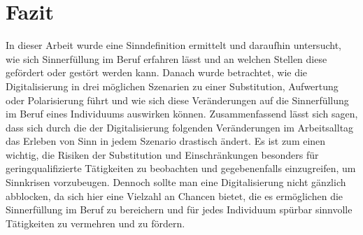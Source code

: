 \chapter{Fazit}
In dieser Arbeit wurde eine Sinndefinition ermittelt und daraufhin untersucht, wie sich Sinnerfüllung im Beruf erfahren lässt und an welchen Stellen diese gefördert oder gestört werden kann. Danach wurde betrachtet, wie die Digitalisierung in drei möglichen Szenarien zu einer Substitution, Aufwertung oder Polarisierung führt und wie sich diese Veränderungen auf die Sinnerfüllung im Beruf eines Individuums auswirken können. Zusammenfassend lässt sich sagen, dass sich durch die der Digitalisierung folgenden Veränderungen im Arbeitsalltag das Erleben von Sinn in jedem Szenario drastisch ändert. Es ist zum einen wichtig, die Risiken der Substitution und Einschränkungen besonders für geringqualifizierte Tätigkeiten zu beobachten und gegebenenfalls einzugreifen, um Sinnkrisen vorzubeugen. Dennoch sollte man eine Digitalisierung nicht gänzlich abblocken, da sich hier eine Vielzahl an Chancen bietet, die es ermöglichen die Sinnerfüllung im Beruf zu bereichern und für jedes Individuum spürbar sinnvolle Tätigkeiten zu vermehren und zu fördern. 